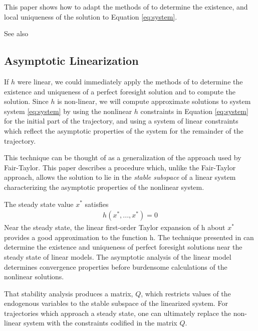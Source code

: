 \documentclass[12pt]{article}
\begin{document}
This paper shows how to adapt the 
methods of \cite{ANDER:AIM2} to determine the existence, and local
uniqueness of the solution to Equation \ref{eq:system}.


See also\cite{brayton11:_two_pract_algor}

\subsection{Asymptotic Linearization}
If $h$ were linear, we could immediately apply the methods of
\cite{ANDER:AIM2} to determine the existence and uniqueness of a perfect 
foresight solution and to
compute the solution.
  Since $h$ is non-linear, we will compute approximate solutions to system
system \ref{eq:system} by  using the nonlinear $h$ constraints in 
Equation \ref{eq:system}
  for the
initial part of the trajectory, and using a system
of linear constraints which reflect the asymptotic properties of the system
 for the remainder of the trajectory.

This technique can be thought of as a generalization of the approach
used by Fair-Taylor\cite{TAYLOR:CAPT}.
This paper describes a procedure which,
unlike the Fair-Taylor approach,
allows the solution to lie in the {\em stable subspace} 
of a linear
system characterizing the asymptotic properties of the
nonlinear system.


The steady state value $x^\ast$ satisfies
\begin{gather}
          h(x^\ast,...,x^\ast) = 0              \label{eq:fixpt}
\end{gather}
Near the steady state, the linear first-order Taylor expansion of h about $x^\ast$ provides a good approximation to the function h.
The technique presented in \cite{ANDER:AIM2} can determine the existence
and uniqueness of perfect foresight solutions near the steady state of
linear models. 
The asymptotic analysis of the linear model
determines convergence properties before burdensome calculations
of the nonlinear solutions.

That stability analysis produces a matrix, $Q$, which restricts values of the
endogenous variables to the stable subspace of the linearized system.
For trajectories which approach  a steady state,    one can  ultimately
 replace the non-linear system with the constraints codified in the matrix $Q$.
\end{document}
